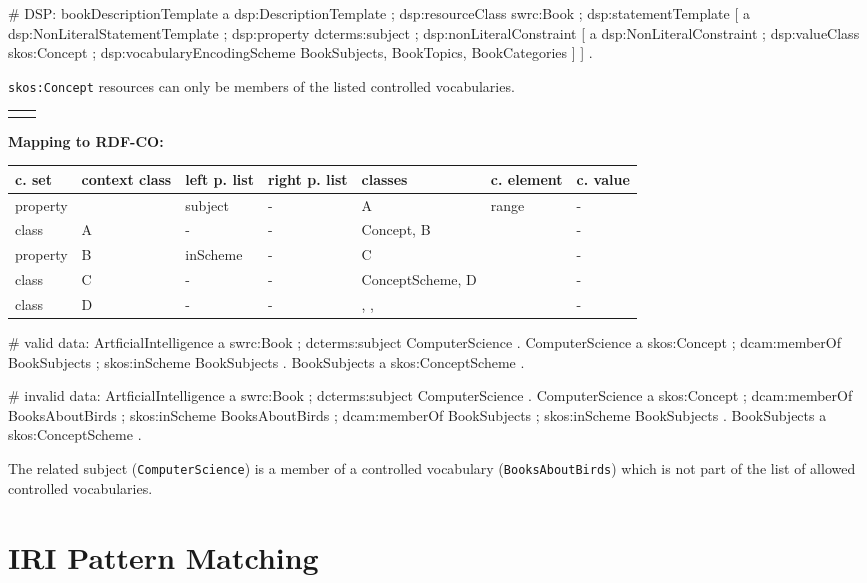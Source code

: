 \documentclass{llncs}
\newcommand{\ms}[1]{\texttt{#1}}
\newenvironment{gcotable}{
  \scriptsize
  \sffamily
  \vspace{0cm}
	\begin{center}
	\textbf{\vspace{0.4cm}Mapping to RDF-CO:} \\
  \begin{tabular}{l|l|l|l|l|l|l}
	\hline
  \textbf{c. set} & \textbf{context class} & \textbf{left p. list} & \textbf{right p. list} & \textbf{classes} & \textbf{c. element} & \textbf{c. value} \\
  \hline

}{
  \hline
  \end{tabular}
	\end{center}
}
\newenvironment{DL}{
\vspace{0cm}
	\begin{center}
  \begin{tabular}{r l}

}{
  \end{tabular}
	\end{center}
}
\begin{document}
\begin{ex}
# DSP:
bookDescriptionTemplate 
    a dsp:DescriptionTemplate ;
    dsp:resourceClass swrc:Book ; 
    dsp:statementTemplate [
        a dsp:NonLiteralStatementTemplate ;
        dsp:property dcterms:subject ; 
        dsp:nonLiteralConstraint [ 
            a dsp:NonLiteralConstraint ;
            dsp:valueClass skos:Concept ; 
            dsp:vocabularyEncodingScheme BookSubjects, BookTopics, BookCategories ] ] .
\end{ex}

\ms{skos:Concept} resources can only be members of the listed controlled vocabularies.

\begin{DL}
 \\
 \\

\end{DL}

\begin{gcotable}
property &  & subject & - & A & range & - \\
class & A & - & - & Concept, B &  & - \\
property & B & inScheme & - & C &  & - \\
class & C & - & - & ConceptScheme, D &  & - \\
class & D & - & - & , ,  &  & - \\
\end{gcotable}

\begin{ex}
# valid data:
ArtficialIntelligence
    a swrc:Book ;
    dcterms:subject ComputerScience .
ComputerScience
    a skos:Concept ;
    dcam:memberOf BookSubjects ;
    skos:inScheme BookSubjects .
BookSubjects
    a skos:ConceptScheme .
\end{ex}

\begin{ex}
# invalid data:
ArtficialIntelligence
    a swrc:Book ;
    dcterms:subject ComputerScience .
ComputerScience
    a skos:Concept ;
    dcam:memberOf BooksAboutBirds ;
    skos:inScheme BooksAboutBirds ;
    dcam:memberOf BookSubjects ;
    skos:inScheme BookSubjects .
BookSubjects
    a skos:ConceptScheme .
\end{ex}

The related subject (\ms{ComputerScience}) is a member of a controlled vocabulary (\ms{BooksAboutBirds}) 
which is not part of the list of allowed controlled vocabularies.

\section{IRI Pattern Matching}
\end{document}
